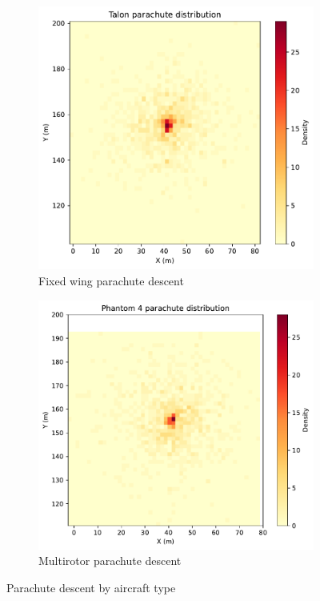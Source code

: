 \documentclass[12pt]{report}
\begin{document}
        \begin{figure}[H]
            \centering
            \begin{subfigure}[b]{0.45\textwidth}
                \centering
                \includegraphics[width=\textwidth]{Plot/talon/Talon parachute distribution.pdf}
                \caption{Fixed wing parachute descent}
                \label{fig:fixed_wing}
            \end{subfigure}
            \hfill
            \begin{subfigure}[b]{0.45\textwidth}
                \centering
                \includegraphics[width=\textwidth]{Plot/phantom4/Phantom_4_parachute_distribution.pdf}
                \caption{Multirotor parachute descent}
                \label{fig:multirotor}
            \end{subfigure}
            \caption{Parachute descent by aircraft type}
            \label{fig:ballistic_descent}
        \end{figure}
\end{document}

